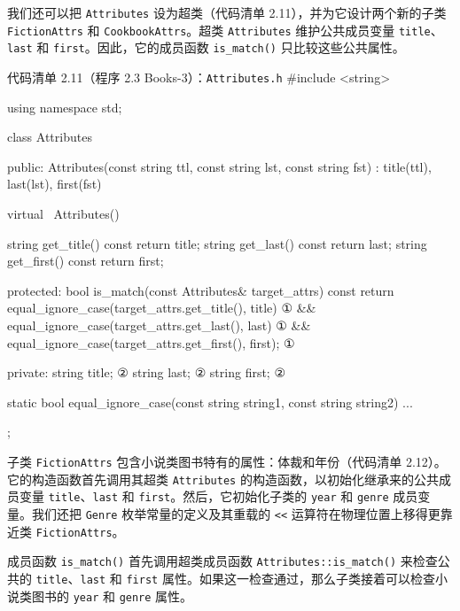 我们还可以把 \texttt{Attributes} 设为超类（代码清单 2.11），并为它设计两个新的子类 \texttt{Fiction\allowbreak{}Attrs} 和 \texttt{Cookbook\allowbreak{}Attrs}。超类 \texttt{Attributes} 维护公共成员变量 \texttt{title}、\texttt{last} 和 \texttt{first}。因此，它的成员函数 \texttt{is\_\allowbreak{}match(\allowbreak{})\allowbreak{}} 只比较这些公共属性。

\begin{codeboxt}{代码清单 2.11（程序 2.3 Books-3）：\texttt{Attributes.\allowbreak{}h}}
#include <string>

using namespace std;

class Attributes
{
public:
    Attributes(const string ttl,
               const string lst, const string fst)
        : title(ttl), last(lst), first(fst) {}

    virtual ~Attributes() {}

    string get_title() const { return title; }
    string get_last()  const { return last; }
    string get_first() const { return first; }

protected:
    bool is_match(const Attributes& target_attrs) const
    {
        return equal_ignore_case(target_attrs.get_title(),  title) ①  
            && equal_ignore_case(target_attrs.get_last(),   last)  ①
            && equal_ignore_case(target_attrs.get_first(), first); ①
    }

private:
    string title;                                                  ②
    string last;                                                   ②
    string first;                                                  ②

    static bool equal_ignore_case(const string string1,
                                  const string string2) ...
};
\end{codeboxt}
\par
{}\par

子类 \texttt{Fiction\allowbreak{}Attrs} 包含小说类图书特有的属性：体裁和年份（代码清单 2.12）。它的构造函数首先调用其超类 \texttt{Attributes} 的构造函数，以初始化继承来的公共成员变量 \texttt{title}、\texttt{last} 和 \texttt{first}。然后，它初始化子类的 \texttt{year} 和 \texttt{genre} 成员变量。我们还把 \texttt{Genre} 枚举常量的定义及其重载的 \texttt{<<} 运算符在物理位置上移得更靠近类 \texttt{Fiction\allowbreak{}Attrs}。

成员函数 \texttt{is\_\allowbreak{}match(\allowbreak{})\allowbreak{}} 首先调用超类成员函数 \texttt{Attributes::\allowbreak{}is\_\allowbreak{}match(\allowbreak{})\allowbreak{}} 来检查公共的 \texttt{title}、\texttt{last} 和 \texttt{first} 属性。如果这一检查通过，那么子类接着可以检查小说类图书的 \texttt{year} 和 \texttt{genre} 属性。

